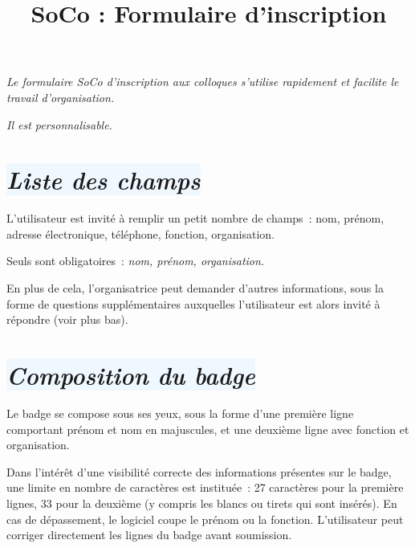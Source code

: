 \documentclass[10pt,a4paper]{article}
\title{\bfseries{SoCo : Formulaire d'inscription}}
\author{}
\date{}
\newcommand{\bleupale}[1]{\colorbox{AliceBlue}{#1}}
\begin{document}
\pagestyle{empty}


\maketitle

\emph{Le formulaire SoCo d'inscription aux colloques s'utilise rapidement et facilite le travail d'organisation.}

\emph{Il est personnalisable.}


\section*{\bleupale{\emph{Liste des champs}}}

L'utilisateur est invité à remplir un petit nombre de champs : nom, prénom, adresse électronique, téléphone, fonction, organisation.

Seuls sont obligatoires : \emph{nom, prénom, organisation.}

En plus de cela, l'organisatrice peut demander d'autres informations, sous la forme de questions supplémentaires auxquelles l'utilisateur est alors invité à répondre (voir plus bas).

\section*{\bleupale{\emph{Composition du badge}}}

Le badge se compose sous ses yeux, sous la forme d'une première ligne comportant prénom et nom en majuscules, et une deuxième ligne avec fonction et organisation.

Dans l'intérêt d'une visibilité correcte des informations présentes sur le badge, une limite en nombre de caractères est instituée : 27 caractères pour la première lignes, 33 pour la deuxième (y compris les blancs ou tirets qui sont insérés). En cas de dépassement, le logiciel coupe le prénom ou la fonction. L'utilisateur peut corriger directement les lignes du badge avant soumission.
\end{document}

